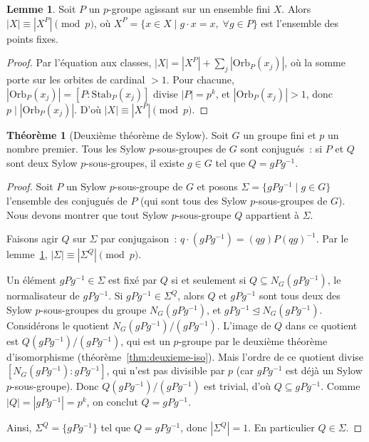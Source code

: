 \documentclass[12pt,a4paper,openany]{book}
\theoremstyle{definition}
\newtheorem{theoreme}{Théorème}[chapter]
\newtheorem{lemme}{Lemme}[chapter]
\begin{document}
\begin{lemme}\label{lem:p-groupe-orbite}
  Soit $P$ un $p$-groupe agissant sur un ensemble fini $X$. Alors
  $|X|\equiv |X^P|\pmod{p}$,
  où $X^P = \{x\in X\mid g\cdot x = x,\;\forall g\in P\}$ est
  l'ensemble des points fixes.
\end{lemme}

\begin{proof}
  Par l'équation aux classes,
  $|X| = |X^P| + \sum_{j} |\mathrm{Orb}_P(x_j)|$,
  où la somme porte sur les orbites de cardinal $>1$. Pour chacune,
  $|\mathrm{Orb}_P(x_j)| = [P:\mathrm{Stab}_P(x_j)]$ divise
  $|P|=p^k$, et $|\mathrm{Orb}_P(x_j)|>1$, donc
  $p\mid|\mathrm{Orb}_P(x_j)|$. D'où
  $|X|\equiv |X^P|\pmod{p}$.
\end{proof}

\begin{theoreme}[Deuxième théorème de Sylow]\label{thm:sylow-2}
  Soit $G$ un groupe fini et $p$ un nombre premier. Tous les Sylow
  $p$-sous-groupes de $G$ sont conjugués~: si $P$ et $Q$ sont deux
  Sylow $p$-sous-groupes, il existe $g\in G$ tel que
  $Q = gPg^{-1}$.
\end{theoreme}

\begin{proof}
  Soit $P$ un Sylow $p$-sous-groupe de $G$ et posons
  $\Sigma = \{gPg^{-1}\mid g\in G\}$ l'ensemble des conjugués de $P$
  (qui sont tous des Sylow $p$-sous-groupes de $G$). Nous devons
  montrer que tout Sylow $p$-sous-groupe $Q$ appartient à $\Sigma$.

  Faisons agir $Q$ sur $\Sigma$ par conjugaison~:
  $q\cdot(gPg^{-1}) = (qg)P(qg)^{-1}$.
  Par le lemme~\ref{lem:p-groupe-orbite},
  $|\Sigma|\equiv|\Sigma^Q|\pmod{p}$.

  Un élément $gPg^{-1}\in\Sigma$ est fixé par $Q$ si et seulement si
  $Q\subseteq N_G(gPg^{-1})$, le normalisateur de $gPg^{-1}$.
  Si $gPg^{-1}\in\Sigma^Q$, alors $Q$ et $gPg^{-1}$ sont tous deux
  des Sylow $p$-sous-groupes du groupe $N_G(gPg^{-1})$, et
  $gPg^{-1}\trianglelefteq N_G(gPg^{-1})$.
  Considérons le quotient $N_G(gPg^{-1})/(gPg^{-1})$. L'image de $Q$
  dans ce quotient est $Q(gPg^{-1})/(gPg^{-1})$, qui est un
  $p$-groupe par le deuxième théorème d'isomorphisme
  (théorème~\ref{thm:deuxieme-iso}). Mais l'ordre de ce quotient
  divise $[N_G(gPg^{-1}):gPg^{-1}]$, qui n'est pas divisible par $p$
  (car $gPg^{-1}$ est déjà un Sylow $p$-sous-groupe). Donc
  $Q(gPg^{-1})/(gPg^{-1})$ est trivial, d'où $Q\subseteq gPg^{-1}$.
  Comme $|Q|=|gPg^{-1}|=p^k$, on conclut $Q = gPg^{-1}$.

  Ainsi, $\Sigma^Q = \{gPg^{-1}\}$ tel que $Q = gPg^{-1}$, donc
  $|\Sigma^Q|=1$. En particulier $Q\in\Sigma$.
\end{proof}
\end{document}
